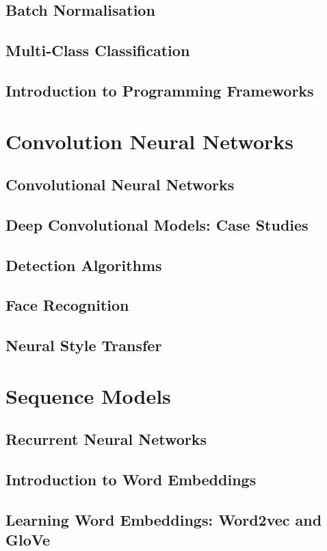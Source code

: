 \documentclass[a4paper, 11pt]{book}
\begin{document}
    \subsection{Batch Normalisation}
    \subsection{Multi-Class Classification}
    \subsection{Introduction to Programming Frameworks}

    \section{Convolution Neural Networks}
    \subsection{Convolutional Neural Networks}
    \subsection{Deep Convolutional Models: Case Studies}
    \subsection{Detection Algorithms}
    \subsection{Face Recognition}
    \subsection{Neural Style Transfer}

    \section{Sequence Models}
    \subsection{Recurrent Neural Networks}
    \subsection{Introduction to Word Embeddings}
    \subsection{Learning Word Embeddings: Word2vec and GloVe}
\end{document}
